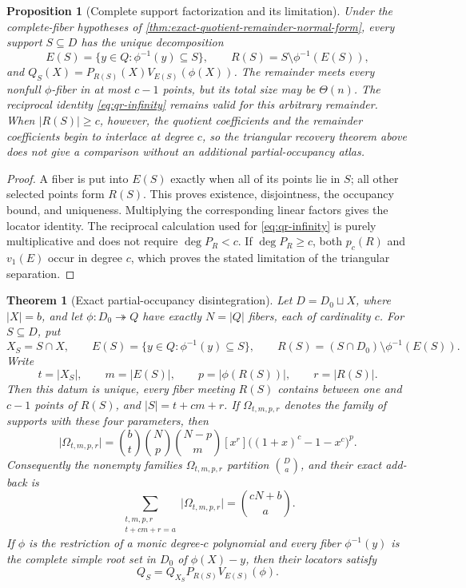 \documentclass[12pt,a4paper]{amsart}
\numberwithin{equation}{section}
\newtheorem{theorem}{Theorem}[section]
\newtheorem{proposition}[proposition]{Proposition}
\theoremstyle{remark}
\newcommand{\abs}[1]{\lvert #1\rvert}
\begin{document}
\begin{proposition}[Complete support factorization and its limitation]
\label{prop:complete-support-factorization}
Under the complete-fiber hypotheses of
\cref{thm:exact-quotient-remainder-normal-form}, every support
\(S\subseteq D\) has the unique decomposition
\[
 E(S)=\{y\in Q:\phi^{-1}(y)\subseteq S\},\qquad
 R(S)=S\setminus\phi^{-1}(E(S)),
 \tag{QR5a}\label{eq:complete-support-factorization}
\]
and
\(Q_S(X)=P_{R(S)}(X)V_{E(S)}(\phi(X))\).  The remainder meets every
nonfull \(\phi\)-fiber in at most \(c-1\) points, but its total size may
be \(\Theta(n)\).  The reciprocal identity \eqref{eq:qr-infinity} remains
valid for this arbitrary remainder.  When \(\abs{R(S)}\ge c\), however,
the quotient coefficients and the remainder coefficients begin to
interlace at degree \(c\), so the triangular recovery theorem above does
not give a comparison without an additional partial-occupancy atlas.
\end{proposition}

\begin{proof}
A fiber is put into \(E(S)\) exactly when all of its points lie in \(S\);
all other selected points form \(R(S)\).  This proves existence,
disjointness, the occupancy bound, and uniqueness.  Multiplying the
corresponding linear factors gives the locator identity.  The reciprocal
calculation used for \eqref{eq:qr-infinity} is purely multiplicative and
does not require \(\deg P_R<c\).  If \(\deg P_R\ge c\), both
\(p_c(R)\) and \(v_1(E)\) occur in degree \(c\), which proves the stated
limitation of the triangular separation.
\end{proof}

\begin{theorem}[Exact partial-occupancy disintegration]
\label{thm:exact-partial-occupancy}
Let \(D=D_0\sqcup X\), where \(\abs X=b\), and let
\(\phi:D_0\twoheadrightarrow Q\) have exactly \(N=\abs Q\) fibers, each
of cardinality \(c\).  For \(S\subseteq D\), put
\[
 X_S=S\cap X,\qquad
 E(S)=\{y\in Q:\phi^{-1}(y)\subseteq S\},\qquad
 R(S)=(S\cap D_0)\setminus\phi^{-1}(E(S)).
\]
Write
\[
 t=\abs{X_S},\qquad m=\abs{E(S)},\qquad
 p=\abs{\phi(R(S))},\qquad r=\abs{R(S)}.
\]
Then this datum is unique, every fiber meeting \(R(S)\) contains between
one and \(c-1\) points of \(R(S)\), and \(\abs S=t+cm+r\).  If
\(\Omega_{t,m,p,r}\) denotes the family of supports with these four
parameters, then
\[
 \abs{\Omega_{t,m,p,r}}
 =\binom bt\binom Np\binom{N-p}m
   [x^r]\bigl((1+x)^c-1-x^c\bigr)^p.                 \tag{PO1}
\]
Consequently the nonempty families \(\Omega_{t,m,p,r}\) partition
\(\binom Da\), and their exact add-back is
\[
 \sum_{\substack{t,m,p,r\\t+cm+r=a}}\abs{\Omega_{t,m,p,r}}
 =\binom{cN+b}{a}.                                   \tag{PO2}
\]
If \(\phi\) is the restriction of a monic degree-\(c\) polynomial and
every fiber \(\phi^{-1}(y)\) is the complete simple root set in \(D_0\)
of \(\phi(X)-y\), then their locators satisfy
\[
             Q_S=Q_{X_S}P_{R(S)}V_{E(S)}(\phi).
\]
\end{theorem}
\end{document}
